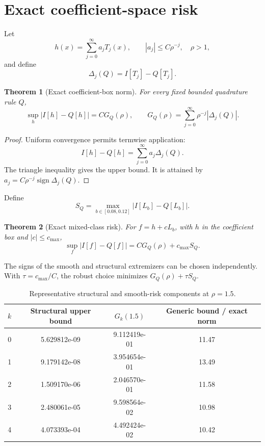 \documentclass[preprint,12pt]{elsarticle}
\newtheorem{theorem}{Theorem}
\theoremstyle{remark}
\begin{document}
\section{Exact coefficient-space risk}

Let
\[
h(x)=\sum_{j=0}^{\infty}a_jT_j(x),
\qquad
|a_j|\leq C\rho^{-j},\quad \rho>1,
\]
and define
\[
\Delta_j(Q)=I[T_j]-Q[T_j].
\]

\begin{theorem}[Exact coefficient-box norm]
For every fixed bounded quadrature rule \(Q\),
\[
\sup_h|I[h]-Q[h]|
=C G_Q(\rho),
\qquad
G_Q(\rho)=\sum_{j=0}^{\infty}\rho^{-j}|\Delta_j(Q)|.
\]
\end{theorem}

\begin{proof}
Uniform convergence permits termwise application:
\[
I[h]-Q[h]=\sum_{j=0}^{\infty}a_j\Delta_j(Q).
\]
The triangle inequality gives the upper bound. It is attained by
\(a_j=C\rho^{-j}\operatorname{sign}\Delta_j(Q)\).
\end{proof}

Define
\[
S_Q=\max_{b\in[0.08,0.12]}|I[L_b]-Q[L_b]|.
\]

\begin{theorem}[Exact mixed-class risk]
For \(f=h+cL_b\), with \(h\) in the coefficient box and
\(|c|\leq c_{\max}\),
\[
\sup_f|I[f]-Q[f]|=C G_Q(\rho)+c_{\max}S_Q.
\]
\end{theorem}

The signs of the smooth and structural extremizers can be chosen
independently. With \(\tau=c_{\max}/C\), the robust choice minimizes
\(G_Q(\rho)+\tau S_Q\).

\begin{table}[ht]
\centering
\caption{Representative structural and smooth-risk components at
\(\rho=1.5\).}
\label{tab:risk}
\small
\begin{tabular}{cccc}
\toprule
\(k\) & Structural upper bound & \(G_k(1.5)\) &
Generic bound / exact norm\\
\midrule
0 & 5.629812e-09 & 9.112419e-01 & 11.47 \\
1 & 9.179142e-08 & 3.954654e-01 & 13.49 \\
2 & 1.509170e-06 & 2.046570e-01 & 11.58 \\
3 & 2.480061e-05 & 9.598564e-02 & 10.98 \\
4 & 4.073393e-04 & 4.492424e-02 & 10.42 \\
\bottomrule
\end{tabular}
\end{table}
\end{document}

